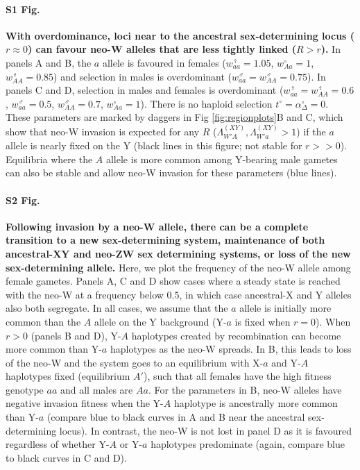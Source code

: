 \documentclass[10pt,letterpaper]{article}
\begin{document}
\paragraph*{S1 Fig.}
\label{fig:positionOverdominance}
{\bf With overdominance, loci near to the ancestral sex-determining locus ($r\approx0$) can favour neo-W alleles that are less tightly linked ($R>r$).} 
In panels A and B, the $a$ allele is favoured in females ($w_{aa}^\female=1.05$, $w_{Aa}^\circ=1$, $w_{AA}^\female=0.85$) and selection in males is overdominant ($w_{aa}^\male=w_{AA}^\male=0.75$).
In panels C and D, selection in males and females is overdominant ($w_{aa}^\female=w_{AA}^\female=0.6$, $w_{aa}^\male=0.5$, $w_{AA}^\male=0.7$, $w_{Aa}^\circ=1$).
There is no haploid selection $t^\circ = \alpha^\circ_\Delta = 0$.
These parameters are marked by daggers in Fig \ref{fig:regionplots}B and C, which show that neo-W invasion is expected for any $R$ ($\Lambda_{W'A}^{(XY)},\Lambda_{W'a}^{(XY)}>1$) if the $a$ allele is nearly fixed on the Y (black lines in this figure; not stable for $r>>0$). 
Equilibria where the $A$ allele is more common among Y-bearing male gametes can also be stable and allow neo-W invasion for these parameters (blue lines). 

\paragraph*{S2 Fig.}
\label{fig:temporalOverdominance}
{\bf Following invasion by a neo-W allele, there can be a complete transition to a new sex-determining system, maintenance of both ancestral-XY and neo-ZW sex determining systems, or loss of the new sex-determining allele.}  
Here, we plot the frequency of the neo-W allele among female gametes.
Panels A, C and D show cases where a steady state is reached with the neo-W at a frequency below $0.5$, in which case ancestral-X and Y alleles also both segregate. 
In all cases, we assume that the $a$ allele is initially more common than the $A$ allele on the Y background (Y-$a$ is fixed when $r=0$). 
When $r>0$ (panels B and D), Y-$A$ haplotypes created by recombination can become more common than Y-$a$ haplotypes as the neo-W spreads.
In B, this leads to loss of the neo-W and the system goes to an equilibrium with X-$a$ and Y-$A$ haplotypes fixed (equilibrium $A'$), such that all females have the high fitness genotype $aa$ and all males are $Aa$. 
For the parameters in B, neo-W alleles have negative invasion fitness when the Y-$A$ haplotype is ancestrally more common than Y-$a$ (compare blue to black curves in A and  B near the ancestral sex-determining locus). 
In contrast, the neo-W is not lost in panel D as it is favoured regardless of whether Y-$A$ or Y-$a$ haplotypes predominate (again, compare blue to black curves in C and  D). 
\end{document}

